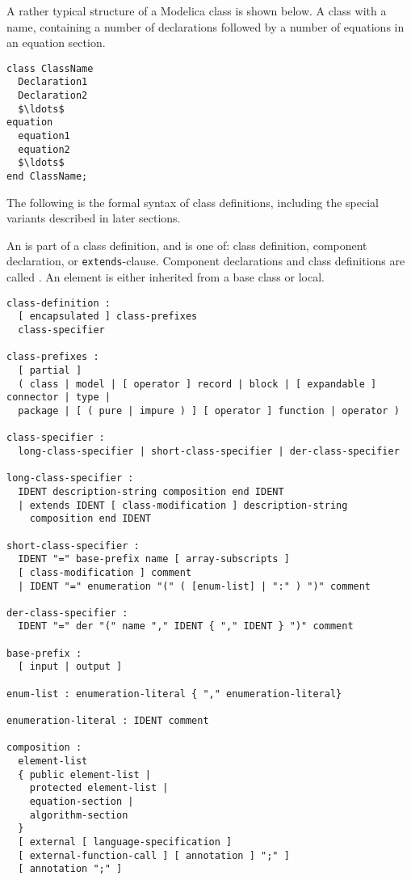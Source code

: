 \begin{example}
A rather typical structure of a Modelica class is
shown below. A class with a name, containing a number of declarations
followed by a number of equations in an equation section.

\begin{lstlisting}[language=modelica]
class ClassName
  Declaration1
  Declaration2
  $\ldots$
equation
  equation1
  equation2
  $\ldots$
end ClassName;
\end{lstlisting}
\end{example}

The following is the formal syntax of class definitions, including the special variants described in later sections.

An  is part of a class definition, and is one of: class definition, component declaration, or \lstinline!extends!-clause.
Component declarations and class definitions are called .
An element is either inherited from a base class or local.

\begin{lstlisting}[language=grammar]
class-definition :
  [ encapsulated ] class-prefixes
  class-specifier

class-prefixes :
  [ partial ]
  ( class | model | [ operator ] record | block | [ expandable ] connector | type |
  package | [ ( pure | impure ) ] [ operator ] function | operator )

class-specifier :
  long-class-specifier | short-class-specifier | der-class-specifier

long-class-specifier :
  IDENT description-string composition end IDENT
  | extends IDENT [ class-modification ] description-string
    composition end IDENT

short-class-specifier :
  IDENT "=" base-prefix name [ array-subscripts ]
  [ class-modification ] comment
  | IDENT "=" enumeration "(" ( [enum-list] | ":" ) ")" comment

der-class-specifier :
  IDENT "=" der "(" name "," IDENT { "," IDENT } ")" comment

base-prefix :
  [ input | output ]

enum-list : enumeration-literal { "," enumeration-literal}

enumeration-literal : IDENT comment

composition :
  element-list
  { public element-list |
    protected element-list |
    equation-section |
    algorithm-section
  }
  [ external [ language-specification ]
  [ external-function-call ] [ annotation ] ";" ]
  [ annotation ";" ]
\end{lstlisting}

